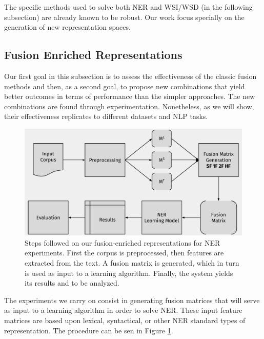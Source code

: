 The specific methods used to solve both NER and WSI/WSD (in the following subsection) are already known to be robust. Our work focus specially on the generation of new representation spaces.

\subsection{Fusion Enriched Representations}
\label{chap6:application}
 Our first goal in this subsection is to assess the effectiveness of the classic fusion methods and then, as a second goal, to propose new combinations that yield better outcomes in terms of performance than the simpler approaches. The new combinations are found through experimentation. Nonetheless, as we will show, their effectiveness replicates to different datasets and NLP tasks. 





\begin{figure}[t]
\centering
\includegraphics[width=0.85\linewidth]{images/Chapitre4/diag_metodoNER.pdf}
\caption{Steps followed on our fusion-enriched representations for NER  experiments. First the corpus is preprocessed, then features are extracted from the text. A fusion matrix is generated, which in turn is used as input to a learning algorithm. Finally, the system yields its results and to be analyzed.}
\label{fig:diagmetodo}
\end{figure}

The experiments we carry on consist in generating fusion matrices that will serve as input to a learning algorithm in order to solve NER. These input feature matrices are based upon lexical, syntactical, or other NER standard types of representation. The procedure can be sen in Figure \ref{fig:diagmetodo}.

